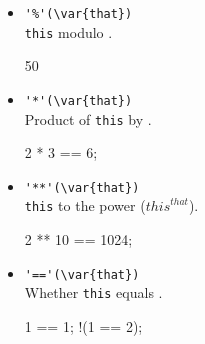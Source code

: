 \begin{itemize}
\item \lstinline|'%'(\var{that})|\\
  \lstinline|this| modulo .
\begin{urbiassert}
50 %
\end{urbiassert}

\item \lstinline|'*'(\var{that})|\\
  Product of \lstinline|this| by .
\begin{urbiassert}
2 * 3 == 6;
\end{urbiassert}

\item \lstinline|'**'(\var{that})|\\
  \lstinline|this| to the  power (${this}^{that}$).
\begin{urbiassert}
2 ** 10 == 1024;
\end{urbiassert}

\item \lstinline|'=='(\var{that})|\\
  Whether \lstinline|this| equals .
\begin{urbiassert}
  1 == 1;
!(1 == 2);
\end{urbiassert}
\end{itemize}


